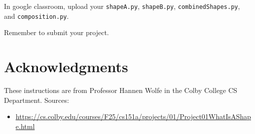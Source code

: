\documentclass[12pt]{article}
\begin{document}
In google classroom, upload your \texttt{shapeA.py}, \texttt{shapeB.py}, \texttt{combinedShapes.py}, and \texttt{composition.py}. 

Remember to submit your project.

\section{Acknowledgments}
These instructions are from Professor Hannen Wolfe in the Colby College CS Department. 
Sources:
\begin{itemize}
\item \footnotesize{\url{https://cs.colby.edu/courses/F25/cs151a/projects/01/Project01WhatIsAShape.html}}
\end{itemize}
\end{document}
